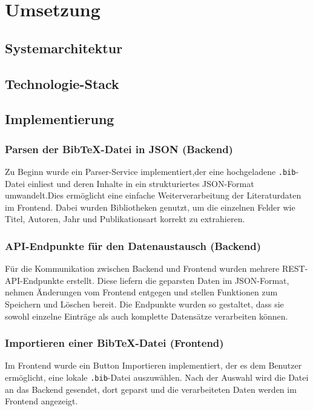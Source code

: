 \chapter{Umsetzung}

\section{Systemarchitektur}

\section{Technologie-Stack}

\section{Implementierung}

\subsection{Parsen der BibTeX-Datei in JSON (Backend)}
Zu Beginn wurde ein Parser-Service implementiert,der eine hochgeladene \texttt{.bib}-Datei einliest 
und deren Inhalte in ein strukturiertes JSON-Format umwandelt.Dies ermöglicht eine einfache Weiterverarbeitung der
Literaturdaten im Frontend. Dabei wurden Bibliotheken
genutzt, um die einzelnen Felder wie Titel, Autoren, Jahr und Publikationsart korrekt zu extrahieren.

\subsection{API-Endpunkte für den Datenaustausch (Backend)}
Für die Kommunikation zwischen Backend und Frontend wurden mehrere REST-API-Endpunkte erstellt.
Diese liefern die geparsten Daten im JSON-Format, nehmen Änderungen vom Frontend entgegen und 
stellen Funktionen zum Speichern und Löschen bereit. Die Endpunkte wurden so gestaltet, dass sie
sowohl einzelne Einträge als auch komplette Datensätze verarbeiten können.

\subsection{Importieren einer BibTeX-Datei (Frontend)}
Im Frontend wurde ein Button \glqq Importieren\grqq{} implementiert,
der es dem Benutzer ermöglicht, eine lokale \texttt{.bib}-Datei auszuwählen.
Nach der Auswahl wird die Datei an das Backend gesendet, dort geparst und die verarbeiteten Daten werden im Frontend angezeigt.

